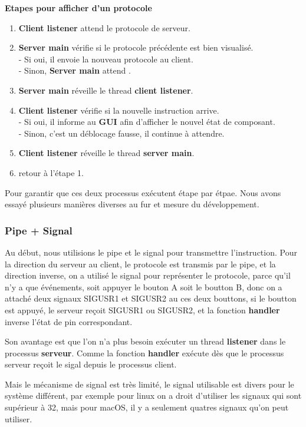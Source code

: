\documentclass[14px]{article}
\begin{document}
\textbf{Etapes pour afficher d'un protocole}
\begin{enumerate}
	\item \textbf{Client listener} attend le protocole de serveur.
	\item \textbf{Server main} vérifie si le protocole précédente est bien visualisé.\\
	- Si oui, il envoie la nouveau protocole au client.\\
	- Sinon, \textbf{Server main} attend .
	\item \textbf{Server main} réveille le thread \textbf{client listener}.
	\item \textbf{Client listener} vérifie si la nouvelle instruction arrive.\\
	- Si oui, il informe au \textbf{GUI} afin d'afficher le nouvel état de composant.\\
	- Sinon, c'est un déblocage fausse, il continue à attendre.
	\item \textbf{Client listener} réveille le thread \textbf{server main}.
	\item retour à l'étape 1.
\end{enumerate}

Pour garantir que ces deux processus exécutent étape par étpae. Nous avons essayé plusieurs manières diverses au fur et mesure du développement.

\subsubsection{Pipe + Signal}
Au début, nous utilisions le pipe et le signal pour transmettre l'instruction. Pour la direction du serveur au client, le protocole est transmis par le pipe, et la direction inverse, on a utilisé le signal pour représenter le protocole, parce qu'il n'y a que événements, soit appuyer le bouton A soit le boutton B, donc on a attaché deux signaux SIGUSR1 et SIGUSR2 au ces deux bouttons, si le boutton est appuyé, le serveur reçoit SIGUSR1 ou SIGUSR2, et la fonction \textbf{handler} inverse l'état de pin correspondant.

Son avantage est que l'on n'a plus besoin exécuter un thread \textbf{listener} dans le processus \textbf{serveur}. Comme la fonction \textbf{handler} exécute dès que le processus serveur reçoit le sigal depuis le processus client.

Mais le mécanisme de signal est très limité, le signal utilisable est divers pour le système différent, par exemple pour linux on a droit d'utiliser les signaux qui sont supérieur à 32, mais pour macOS, il y a seulement quatres signaux qu'on peut utiliser.
\end{document}
